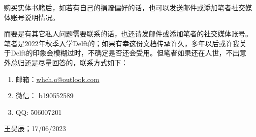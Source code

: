 购买实体书籍后，如若有自己的捐赠偏好的话，也可以发送邮件或添加笔者社交媒体账号说明情况。

而要是有其它私人问题需要联系的话，也还请发邮件或添加笔者的社交媒体账号。笔者是2022年秋季入学Delft的；如果有幸这份文档传承许久，多年以后或许我关于Delft的印象会模糊过时，不确定是否还会受用。但笔者如果还在人世，不出意外总归还是尽量回答的，联系方式如下：
\begin{enumerate}
\item 邮箱：\href{mailto:whch.o@outlook.com}{whch.o@outlook.com}
\item 微信： b190552589
\item QQ: 506007201
\end{enumerate}

\begin{flushright}
王昊辰；17/06/2023
\end{flushright}
